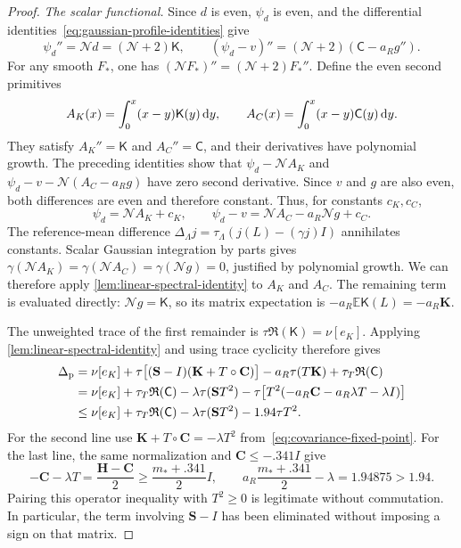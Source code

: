 \begin{proof}
\smallskip\noindent\emph{The scalar functional.} Since $d$ is even, $\psi_d$ is even, and the differential identities~\eqref{eq:gaussian-profile-identities} give
\[
 \psi_d''=\mathcal{N} d=(\mathcal{N}+2)\mathsf K,
 \qquad
 (\psi_d-v)''=(\mathcal{N}+2)(\mathsf C-a_R g'').
\]
For any smooth $F_*$, one has $(\mathcal{N} F_*)''=(\mathcal{N}+2)F_*''$. Define the even second primitives
\[
 A_K(x)=\int_0^x(x-y)\mathsf K(y)\,\mathrm{d} y,\qquad
 A_C(x)=\int_0^x(x-y)\mathsf C(y)\,\mathrm{d} y.
\]
They satisfy $A_K''=\mathsf K$ and $A_C''=\mathsf C$, and their derivatives have polynomial growth. The preceding identities show that $\psi_d-\mathcal{N} A_K$ and $\psi_d-v-\mathcal{N}(A_C-a_Rg)$ have zero second derivative. Since $v$ and $g$ are also even, both differences are even and therefore constant. Thus, for constants $c_K,c_C$,
\[
 \psi_d=\mathcal{N} A_K+c_K,\qquad
 \psi_d-v=\mathcal{N} A_C-a_R\mathcal{N} g+c_C.
\]
The reference-mean difference $\Delta_\Lambda j=\tau_\Lambda(j(L)-(\gamma j)I)$ annihilates constants. Scalar Gaussian integration by parts gives $\gamma(\mathcal{N} A_K)=\gamma(\mathcal{N} A_C) =\gamma(\mathcal{N} g)=0$, justified by polynomial growth. We can therefore apply \cref{lem:linear-spectral-identity} to $A_K$ and $A_C$. The remaining term is evaluated directly: $\mathcal{N} g=\mathsf K$, so its matrix expectation is $-a_R\mathbb{E}\mathsf K(L)=-a_R\mathbf{K}$.

The unweighted trace of the first remainder is $\tau\mathfrak{R}(\mathsf K)=\nu[e_K]$.  Applying \cref{lem:linear-spectral-identity} and using trace cyclicity therefore gives
\begin{equation}
 \begin{aligned}
 \Delta_{\rm p}
 &=\nu[e_K]+\tau\bigl[(\mathbf{S}-I)
                   (\mathbf{K}+T\circ\mathbf{C})\bigr]
             -a_R\tau(T\mathbf{K})+\tau_T\mathfrak{R}(\mathsf C)\\
 &=\nu[e_K]+\tau_T\mathfrak{R}(\mathsf C)
             -\lambda\tau(\mathbf{S} T^2)
             -\tau\bigl[T^2(-a_R\mathbf{C}-a_R\lambda T-\lambda I)\bigr]\\
 &\le\nu[e_K]+\tau_T\mathfrak{R}(\mathsf C)
             -\lambda\tau(\mathbf{S} T^2)-1.94\tau T^2.
 \end{aligned}
 \label{eq:linear-entropy-comparison}
\end{equation}
For the second line use $\mathbf{K}+T\circ\mathbf{C}=-\lambda T^2$ from~\eqref{eq:covariance-fixed-point}. For the last line, the same normalization and $\mathbf{C}\le-.341I$ give
\[
 -\mathbf{C}-\lambda T
    =\frac{\mathbf{H}-\mathbf{C}}{2}
    \ge\frac{m_*+.341}{2}I,
 \qquad
 a_R\frac{m_*+.341}{2}-\lambda=1.94875>1.94.
\]
Pairing this operator inequality with $T^2\ge0$ is legitimate without commutation.  In particular, the term involving $\mathbf{S}-I$ has been eliminated without imposing a sign on that matrix.


\end{proof}
